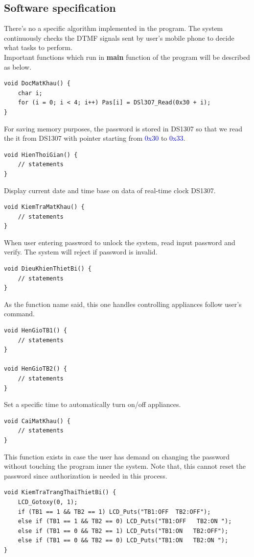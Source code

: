 \documentclass[a4paper]{article}
\begin{document}
\subsection{Software specification}
There's no a specific algorithm implemented in the program. The system continuously checks the DTMF signals sent by user's mobile phone to decide what tasks to perform.\\
Important functions which run in \textbf{main} function of the program will be described as below.
\begin{lstlisting}
void DocMatKhau() {
    char i;
    for (i = 0; i < 4; i++) Pas[i] = DSl3O7_Read(0x30 + i);
}
\end{lstlisting}
For saving memory purposes, the password is stored in DS1307 so that we read the it from DS1307 with pointer starting from \textcolor{blue}{0x30} to \textcolor{blue}{0x33}.
\begin{lstlisting}
void HienThoiGian() {
    // statements
}
\end{lstlisting}
Display current date and time base on data of real-time clock DS1307.
\begin{lstlisting}
void KiemTraMatKhau() {
    // statements
}
\end{lstlisting}
When user entering password to unlock the system, read input password and verify. The system will reject if password is invalid.
\begin{lstlisting}
void DieuKhienThietBi() {
    // statements
}
\end{lstlisting}
As the function name said, this one handles controlling appliances follow user's command.
\begin{lstlisting}
void HenGioTB1() {
    // statements
}

void HenGioTB2() {
    // statements
}
\end{lstlisting}
Set a specific time to automatically turn on/off appliances.
\begin{lstlisting}
void CaiMatKhau() {
    // statements
}
\end{lstlisting}
This function exists in case the user has demand on changing the password without touching the program inner the system. Note that, this cannot reset the password since authorization is needed in this process.
\begin{lstlisting}
void KiemTraTrangThaiThietBi() {
    LCD_Gotoxy(0, 1);
    if (TB1 == 1 && TB2 == 1) LCD_Puts("TB1:OFF  TB2:OFF");
    else if (TB1 == 1 && TB2 == 0) LCD_Puts("TB1:OFF   TB2:ON ");
    else if (TB1 == 0 && TB2 == 1) LCD_Puts("TB1:ON   TB2:OFF");
    else if (TB1 == 0 && TB2 == 0) LCD_Puts("TB1:ON   TB2:ON ");
}
\end{lstlisting}
\end{document}
